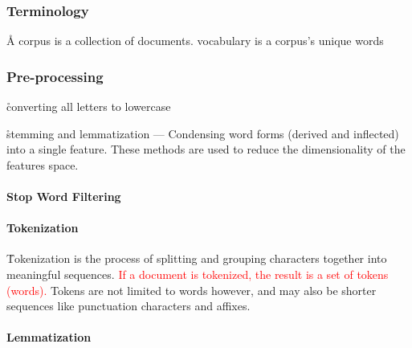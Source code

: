 
\subsubsection{Terminology}

\r{A {corpus} is a collection of documents. {vocabulary} is a corpus's unique words}

\subsubsection{Pre-processing}


\r{converting all letters to lowercase}

\r{stemming and lemmatization --- Condensing word forms (derived and inflected) into a single feature. These methods are used to reduce the dimensionality of the features space.}

\paragraph{Stop Word Filtering}



\paragraph{Tokenization}

\r{Tokenization is the process of splitting and grouping characters together into meaningful sequences. \textcolor{red}{If a document is tokenized, the result is a set of tokens (words).} Tokens are not limited to words however, and may also be shorter sequences like punctuation characters and affixes.}


\paragraph{Lemmatization}


